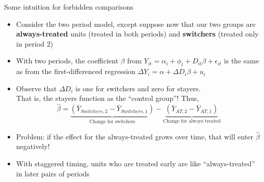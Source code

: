 \documentclass[aspectratio = 169, 13pt]{beamer}
\begin{document}
\begin{frame}{Some intuition for forbidden comparisons}
	\begin{itemize}
		\item
		Consider the two period model, except suppose now that our two groups are \textbf{always-treated} units (treated in both periods) and \textbf{switchers} (treated only in period 2) \medskip
		
		\item
		With two periods, the coefficient  $\beta$ from $ Y_{it} = \alpha_i + \phi_t + D_{it} \beta  + \epsilon_{it}$ is the same as from the first-differenced regression  $\Delta Y_i = \alpha + \Delta D_i \beta + u_i$ \medskip
		
		\item
		Observe that $\Delta D_i$ is one for switchers and zero for stayers. \\ That is, the stayers function as the ``control group''! Thus,
		$$\hat\beta =  \underbrace{ \left(\bar{Y}_{Switchers, 2} - \bar{Y}_{Switchers, 1} \right) }_{\text{Change for switchers}} - \underbrace{ \left(\bar{Y}_{AT, 2} - \bar{Y}_{AT, 1} \right) }_{\text{Change for always treated}}  $$
		
		\item
		Problem: if the effect for the always-treated grows over time, that will enter $\hat\beta$ negatively!  \medskip
		
		\item
		With staggered timing, units who are treated early are like ``always-treated'' in later pairs of periods
		
	\end{itemize}
\end{frame}
\end{document}
